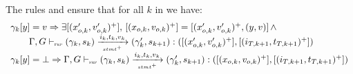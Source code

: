 \begin{skippableproof}
\begin{itemize}
\begin{itemize}
                        The rules  and
                         ensure that for
                        all $k$ in \N we have:
                        \begin{equation*}
                            \begin{array}{l}
                                \gamma_k[y] = v \Rightarrow \exists [(x'_{o, k}, v'_{o, k})^+], \,
                                [(x_{o, k}, v_{o, k})^+] = [(x'_{o, k}, v'_{o, k})^+, (y, v)] \, \wedge \\
                                \qquad \Gamma, G \vdash_{\textnormal{\tiny\textsc{frp}}} (\gamma_k, s_k) \xrightarrow[\mbox{\tiny\ensuremath{stmt^+}}]{i_k, t_k, v_k} (\gamma'_k, s_{k+1}): ([(x'_{o, k}, v'_{o, k})^+], [(i_{T, k+1}, t_{T, k+1})^+])         \\
                                \gamma_k[y] = \bot \Rightarrow
                                \Gamma, G \vdash_{\textnormal{\tiny\textsc{frp}}} (\gamma_k, s_k) \xrightarrow[\mbox{\tiny\ensuremath{stmt^+}}]{i_k, t_k, v_k} (\gamma'_k, s_{k+1}): ([(x_{o, k}, v_{o, k})^+], [(i_{T, k+1}, t_{T, k+1})^+])
                            \end{array}
                        \end{equation*}


\end{itemize}
\end{itemize}
\end{skippableproof}
